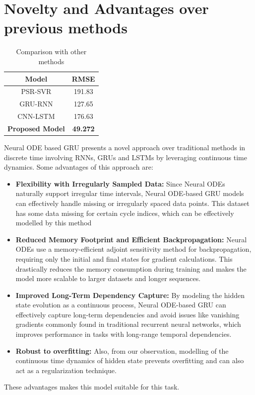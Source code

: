 \documentclass[12pt]{article}
\begin{document}
	\section{\large{Novelty and Advantages over previous methods}}
	\begin{table}[h]
		\centering
		\begin{tabular}{|c|c|}
			\hline
			Model & RMSE \\
			\hline
			PSR-SVR & 191.83 \\
			\hline
			GRU-RNN & 127.65 \\
			\hline
			CNN-LSTM & 176.63 \\
			\hline
			\textbf{Proposed Model} & \textbf{49.272} \\
			\hline
		\end{tabular}
		\caption{Comparison with other methods}
		\label{tab:comparison}
	\end{table}
	Neural ODE based GRU presents a novel approach over traditional methods in discrete time involving RNNs, GRUs and LSTMs by leveraging continuous time dynamics. Some advantages of this approach are:
	\begin{itemize}
		\item \textbf{Flexibility with Irregularly Sampled Data:} Since Neural ODEs naturally support irregular time intervals, Neural ODE-based GRU models can effectively handle missing or irregularly spaced data points. This dataset has some data missing for certain cycle indices, which can be effectively modelled by this method
		
		\item \textbf{Reduced Memory Footprint and Efficient Backpropagation:} Neural ODEs use a memory-efficient adjoint sensitivity method for backpropagation, requiring only the initial and final states for gradient calculations. This drastically reduces the memory consumption during training and makes the model more scalable to larger datasets and longer sequences.
		
		\item \textbf{Improved Long-Term Dependency Capture:} By modeling the hidden state evolution as a continuous process, Neural ODE-based GRU can effectively capture long-term dependencies and avoid issues like vanishing gradients commonly found in traditional recurrent neural networks, which improves performance in tasks with long-range temporal dependencies.
		
		\item \textbf{Robust to overfitting:} Also, from our observation, modelling of the continuous time dynamics of hidden state prevents overfitting and can also act as a regularization technique.
	\end{itemize}
	These advantages makes this model suitable for this task.
\end{document}
